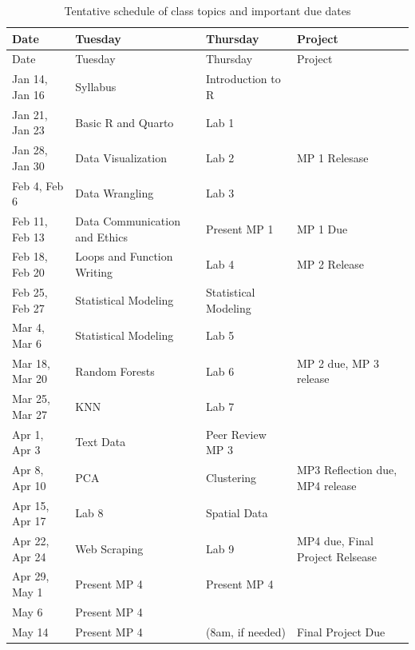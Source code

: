 \documentclass[
  11pt,
  letterpaper,
  DIV=11,
  numbers=noendperiod]{scrartcl}
\begin{document}
\begin{longtable}[]{@{}llll@{}}
\caption{Tentative schedule of class topics and important due
dates}\tabularnewline
\toprule\noalign{}
Date & Tuesday & Thursday & Project \\
\midrule\noalign{}
\endfirsthead
\toprule\noalign{}
Date & Tuesday & Thursday & Project \\
\midrule\noalign{}
\endhead
\bottomrule\noalign{}
\endlastfoot
Jan 14, Jan 16 & Syllabus & Introduction to R & \\
Jan 21, Jan 23 & Basic R and Quarto & Lab 1 & \\
Jan 28, Jan 30 & Data Visualization & Lab 2 & MP 1 Relesase \\
Feb 4, Feb 6 & Data Wrangling & Lab 3 & \\
Feb 11, Feb 13 & Data Communication and Ethics & Present MP 1 & MP 1
Due \\
Feb 18, Feb 20 & Loops and Function Writing & Lab 4 & MP 2 Release \\
Feb 25, Feb 27 & Statistical Modeling & Statistical Modeling & \\
Mar 4, Mar 6 & Statistical Modeling & Lab 5 & \\
Mar 18, Mar 20 & Random Forests & Lab 6 & MP 2 due, MP 3 release \\
Mar 25, Mar 27 & KNN & Lab 7 & \\
Apr 1, Apr 3 & Text Data & Peer Review MP 3 & \\
Apr 8, Apr 10 & PCA & Clustering & MP3 Reflection due, MP4 release \\
Apr 15, Apr 17 & Lab 8 & Spatial Data & \\
Apr 22, Apr 24 & Web Scraping & Lab 9 & MP4 due, Final Project
Relsease \\
Apr 29, May 1 & Present MP 4 & Present MP 4 & \\
May 6 & Present MP 4 & & \\
May 14 & Present MP 4 & (8am, if needed) & Final Project Due \\
\end{longtable}
\end{document}
